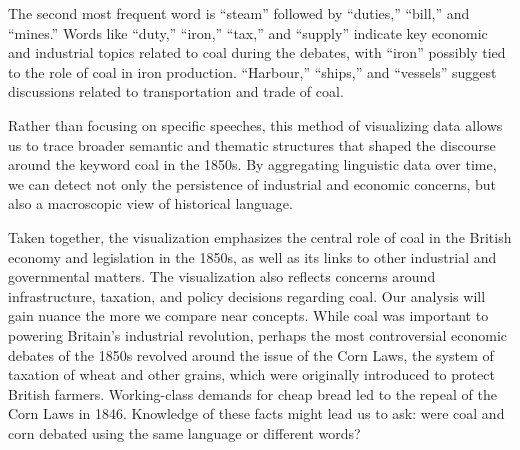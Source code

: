 \documentclass[
]{article}
\begin{document}
The second most frequent word is ``steam'' followed by ``duties,''
``bill,'' and ``mines.'' Words like ``duty,'' ``iron,'' ``tax,'' and
``supply'' indicate key economic and industrial topics related to coal
during the debates, with ``iron'' possibly tied to the role of coal in
iron production. ``Harbour,'' ``ships,'' and ``vessels'' suggest
discussions related to transportation and trade of coal.

Rather than focusing on specific speeches, this method of visualizing
data allows us to trace broader semantic and thematic structures that
shaped the discourse around the keyword coal in the 1850s. By
aggregating linguistic data over time, we can detect not only the
persistence of industrial and economic concerns, but also a macroscopic
view of historical language.

Taken together, the visualization emphasizes the central role of coal in
the British economy and legislation in the 1850s, as well as its links
to other industrial and governmental matters. The visualization also
reflects concerns around infrastructure, taxation, and policy decisions
regarding coal. Our analysis will gain nuance the more we compare near
concepts. While coal was important to powering Britain's industrial
revolution, perhaps the most controversial economic debates of the 1850s
revolved around the issue of the Corn Laws, the system of taxation of
wheat and other grains, which were originally introduced to protect
British farmers. Working-class demands for cheap bread led to the repeal
of the Corn Laws in 1846. Knowledge of these facts might lead us to ask:
were coal and corn debated using the same language or different words?
\end{document}
